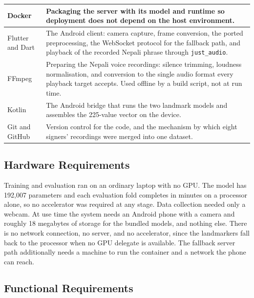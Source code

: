 \begin{longtable}{|p{3.4cm}|p{9.6cm}|}
        \hline
        Docker & Packaging the server with its model and runtime so deployment does not depend on the host environment. \\
        \hline
        Flutter and Dart & The Android client: camera capture, frame conversion, the ported preprocessing, the WebSocket protocol for the fallback path, and playback of the recorded Nepali phrase through \texttt{just\_audio}. \\
        \hline
        FFmpeg & Preparing the Nepali voice recordings: silence trimming, loudness normalisation, and conversion to the single audio format every playback target accepts. Used offline by a build script, not at run time. \\
        \hline
        Kotlin & The Android bridge that runs the two landmark models and assembles the 225-value vector on the device. \\
        \hline
        Git and GitHub & Version control for the code, and the mechanism by which eight signers' recordings were merged into one dataset. \\
\end{longtable}
\endgroup

\subsection{Hardware Requirements}

Training and evaluation ran on an ordinary laptop with no GPU. The model has 192{,}007 parameters and each evaluation fold completes in minutes on a processor alone, so no accelerator was required at any stage. Data collection needed only a webcam. At use time the system needs an Android phone with a camera and roughly 18 megabytes of storage for the bundled models, and nothing else. There is no network connection, no server, and no accelerator, since the landmarkers fall back to the processor when no GPU delegate is available. The fallback server path additionally needs a machine to run the container and a network the phone can reach.

\subsection{Functional Requirements}

